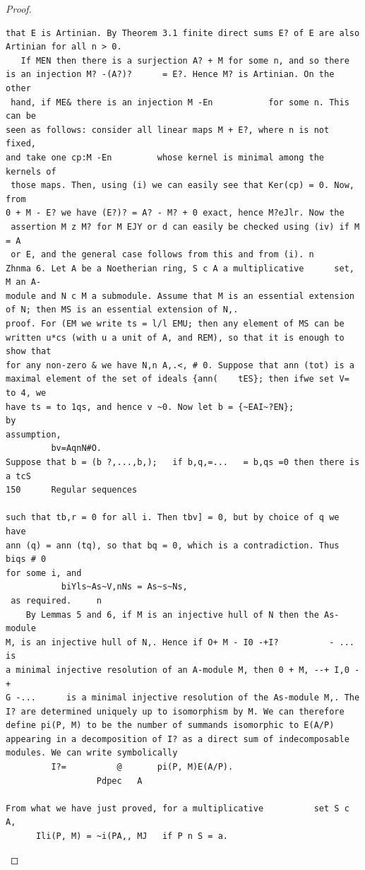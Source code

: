 \begin{proof}
\begin{verbatim}
that E is Artinian. By Theorem 3.1 finite direct sums E? of E are also
Artinian for all n > 0.
   If MEN then there is a surjection A? + M for some n, and so there
is an injection M? -(A?)?      = E?. Hence M? is Artinian. On the other
 hand, if ME& there is an injection M -En           for some n. This can be
seen as follows: consider all linear maps M + E?, where n is not fixed,
and take one cp:M -En         whose kernel is minimal among the kernels of
 those maps. Then, using (i) we can easily see that Ker(cp) = 0. Now, from
0 + M - E? we have (E?)? = A? - M? + 0 exact, hence M?eJlr. Now the
 assertion M z M? for M EJY or d can easily be checked using (iv) if M = A
 or E, and the general case follows from this and from (i). n
Zhnma 6. Let A be a Noetherian ring, S c A a multiplicative      set, M an A-
module and N c M a submodule. Assume that M is an essential extension
of N; then MS is an essential extension of N,.
proof. For (EM we write ts = l/l EMU; then any element of MS can be
written u*cs (with u a unit of A, and REM), so that it is enough to show that
for any non-zero & we have N,n A,.<, # 0. Suppose that ann (tot) is a
maximal element of the set of ideals {ann(    tES}; then ifwe set V= to 4, we
have ts = to 1qs, and hence v ~0. Now let b = {~EAI~?EN};                  by
assumption,
         bv=AqnN#O.
Suppose that b = (b ?,...,b,);   if b,q,=...   = b,qs =0 then there is a tcS
150      Regular sequences

such that tb,r = 0 for all i. Then tbv] = 0, but by choice of q we have
ann (q) = ann (tq), so that bq = 0, which is a contradiction. Thus biqs # 0
for some i, and
           biYls~As~V,nNs = As~s~Ns,
 as required.     n
    By Lemmas 5 and 6, if M is an injective hull of N then the As-module
M, is an injective hull of N,. Hence if O+ M - I0 -+I?          - ... is
a minimal injective resolution of an A-module M, then 0 + M, --+ I,0 -+
G -...      is a minimal injective resolution of the As-module M,. The
I? are determined uniquely up to isomorphism by M. We can therefore
define pi(P, M) to be the number of summands isomorphic to E(A/P)
appearing in a decomposition of I? as a direct sum of indecomposable
modules. We can write symbolically
         I?=          @       pi(P, M)E(A/P).
                  Pdpec   A

From what we have just proved, for a multiplicative          set S c A,
      Ili(P, M) = ~i(PA,, MJ   if P n S = a.
\end{verbatim}
\end{proof}


